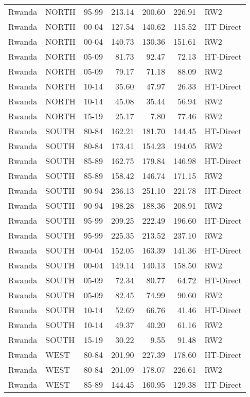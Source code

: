 \begin{longtable}{lllrrrl}
  Rwanda & NORTH & 95-99 & 213.14 & 200.60 & 226.91 & RW2 \\ 
  Rwanda & NORTH & 00-04 & 127.54 & 140.62 & 115.52 & HT-Direct \\ 
  Rwanda & NORTH & 00-04 & 140.73 & 130.36 & 151.61 & RW2 \\ 
  Rwanda & NORTH & 05-09 & 81.73 & 92.47 & 72.13 & HT-Direct \\ 
  Rwanda & NORTH & 05-09 & 79.17 & 71.18 & 88.09 & RW2 \\ 
  Rwanda & NORTH & 10-14 & 35.60 & 47.97 & 26.33 & HT-Direct \\ 
  Rwanda & NORTH & 10-14 & 45.08 & 35.44 & 56.94 & RW2 \\ 
  Rwanda & NORTH & 15-19 & 25.17 & 7.80 & 77.46 & RW2 \\ 
  Rwanda & SOUTH & 80-84 & 162.21 & 181.70 & 144.45 & HT-Direct \\ 
  Rwanda & SOUTH & 80-84 & 173.41 & 154.23 & 194.05 & RW2 \\ 
  Rwanda & SOUTH & 85-89 & 162.75 & 179.84 & 146.98 & HT-Direct \\ 
  Rwanda & SOUTH & 85-89 & 158.42 & 146.74 & 171.15 & RW2 \\ 
  Rwanda & SOUTH & 90-94 & 236.13 & 251.10 & 221.78 & HT-Direct \\ 
  Rwanda & SOUTH & 90-94 & 198.28 & 188.36 & 208.91 & RW2 \\ 
  Rwanda & SOUTH & 95-99 & 209.25 & 222.49 & 196.60 & HT-Direct \\ 
  Rwanda & SOUTH & 95-99 & 225.35 & 213.52 & 237.10 & RW2 \\ 
  Rwanda & SOUTH & 00-04 & 152.05 & 163.39 & 141.36 & HT-Direct \\ 
  Rwanda & SOUTH & 00-04 & 149.14 & 140.13 & 158.50 & RW2 \\ 
  Rwanda & SOUTH & 05-09 & 72.34 & 80.77 & 64.72 & HT-Direct \\ 
  Rwanda & SOUTH & 05-09 & 82.45 & 74.99 & 90.60 & RW2 \\ 
  Rwanda & SOUTH & 10-14 & 52.69 & 66.76 & 41.46 & HT-Direct \\ 
  Rwanda & SOUTH & 10-14 & 49.37 & 40.20 & 61.16 & RW2 \\ 
  Rwanda & SOUTH & 15-19 & 30.22 & 9.55 & 91.48 & RW2 \\ 
  Rwanda & WEST & 80-84 & 201.90 & 227.39 & 178.60 & HT-Direct \\ 
  Rwanda & WEST & 80-84 & 201.09 & 178.07 & 226.61 & RW2 \\ 
  Rwanda & WEST & 85-89 & 144.45 & 160.95 & 129.38 & HT-Direct \\ 

\end{longtable}

